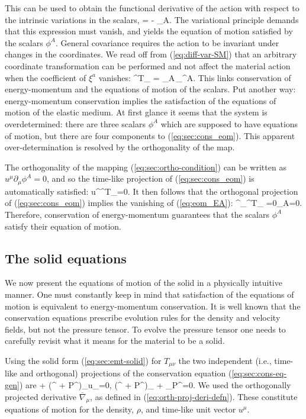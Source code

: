 This can be used to obtain the functional derivative of the action with respect to the intrinsic variations in the scalars,
\bea
\label{eq:eom_EA}
 = - _A.
\eea
The variational principle demands that this expression must vanish, and yields the equation of motion satisfied by the scalars $\phi^A$.
General covariance requires the action to be invariant under changes in the coordinates. We read off from (\ref{eq:diff-var-SM}) that an arbitrary coordinate transformation  can be performed and not affect the material action when the coefficient of $\xi^a$ vanishes:
\bea
\label{eq:sec:cons_eom}
\nabla^{\nu}T_{\mu\nu} = _A\,\partial_{\mu}\phi^A.
\eea
This links  conservation of energy-momentum and the equations of motion of the scalars. Put another way: energy-momentum conservation implies the satisfaction of the equations of motion of the elastic medium. At first glance it seems that the system is overdetermined: there are three scalars $\phi^A$ which are supposed to have equations of motion, but there are four components to (\ref{eq:sec:cons_eom}). This apparent over-determination is resolved by the orthogonality of the map.

The orthogonality of the mapping (\ref{eq:sec:ortho-condition})    can be written as $u^{\mu}\partial_{\mu}\phi^A = 0$, and so   the time-like projection of (\ref{eq:sec:cons_eom}) is automatically satisfied:
\bea
u^{\mu}\nabla^{\nu}T_{\mu\nu}=0.
\eea
It then follows that the orthogonal projection of (\ref{eq:sec:cons_eom}) implies the vanishing of (\ref{eq:eom_EA}):
\bea
{\gamma^\mu}_{\alpha}\nabla^{\nu}T_{\mu\nu} =0\qquad \Longleftrightarrow\qquad {}_A=0.
\eea
Therefore, conservation of energy-momentum guarantees that the scalars $\phi^A$ satisfy their equation of motion.

\subsection{The solid equations}
We now present the  equations of motion of the solid in a physically intuitive manner. One must constantly keep in mind that satisfaction of the equations of motion is equivalent to energy-momentum conservation. It is well known that the conservation equations prescribe evolution rules for the density and velocity fields, but not the pressure tensor. To evolve the pressure tensor one needs to carefully revisit what it means for the material to be a solid.

Using the solid form (\ref{eq:sec:emt-solid}) for $T_{\mu\nu}$ the two independent (i.e., time-like and orthogonal) projections of the conservation equation (\ref{eq:sec:cons-eq-gen}) are
\bse
\bea
\label{eq:sec:density-cons}
\dot{\rho} + (\rho \gamma^{\mu\nu} + P^{\mu\nu})\nabla_{\mu}u_{\nu}=0,
\eea
\bea
\label{eq:sec:pressure-cons}
(\rho \gamma^{\mu\nu} + P^{\mu\nu})_{\nu} + \overline{\nabla}_{\nu}P^{\mu\nu}=0.
\eea
\ese
We used the orthogonally projected derivative $\overline{\nabla}_{\mu}$, as defined in (\ref{eq:orth-proj-deri-defn}). These constitute equations of motion for the density, $\rho$, and time-like unit vector $u^{\mu}$. 

